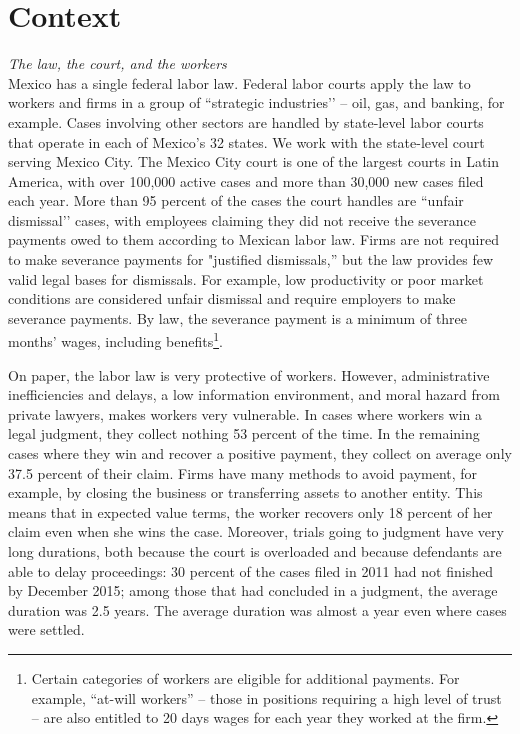 \documentclass[12 pt]{article}
\begin{document}

\section{Context} \label{sec:context}
\emph{The law, the court, and the workers}\\
Mexico has a single federal labor law. Federal labor courts apply the law to workers and firms in a group of “strategic industries’’ – oil, gas, and banking, for example. Cases involving other sectors are handled by state-level labor courts that operate in each of Mexico’s 32 states. We work with the state-level court serving Mexico City. The Mexico City court is one of the largest courts in Latin America, with over 100,000 active cases and more than 30,000 new cases filed each year. More than 95 percent of the cases the court handles are “unfair dismissal’’ cases, with employees claiming they did not receive the severance payments owed to them according to Mexican labor law. Firms are not required to make severance payments for "justified dismissals,” but the law provides few valid legal bases for dismissals. For example, low productivity or poor market conditions are considered unfair dismissal and require employers to make severance payments. By law, the severance payment is a minimum of three months' wages, including benefits\footnote{Certain categories of workers are eligible for additional payments. For example, “at-will workers” – those in positions requiring a high level of trust – are also entitled to 20 days wages for each year they worked at the firm.}. 

On paper, the labor law is very protective of workers. However, administrative inefficiencies and delays, a low information environment, and moral hazard from private lawyers, makes workers very vulnerable. In cases where workers win a legal judgment, they collect nothing 53 percent of the time. In the remaining cases where they win and recover a positive payment, they collect on average only 37.5 percent of their claim. Firms have many methods to avoid payment, for example, by closing the business or transferring assets to another entity. This means that in expected value terms, the worker recovers only 18 percent of her claim even when she wins the case. Moreover, trials going to judgment have very long durations, both because the court is overloaded and because defendants are able to delay proceedings: 30 percent of the cases filed in 2011 had not finished by December 2015; among those that had concluded in a judgment, the average duration was 2.5 years. The average duration was almost a year even where cases were settled.
\end{document}
